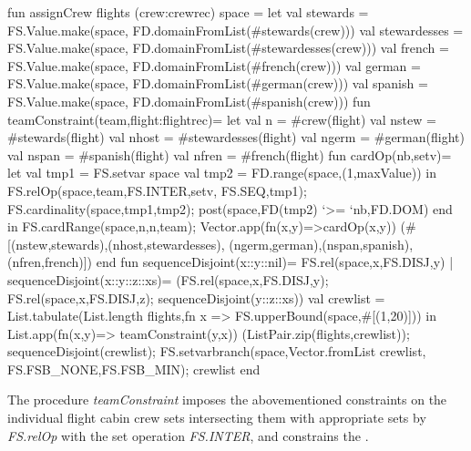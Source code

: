 \documentclass[a4paper]{scrartcl}
\begin{document}
\begin{myverbatim}
fun assignCrew flights (crew:crewrec) space =
    let
       val stewards = FS.Value.make(space,
                      FD.domainFromList(#stewards(crew)))
       val stewardesses = FS.Value.make(space,
                      FD.domainFromList(#stewardesses(crew)))
       val french = FS.Value.make(space,
                      FD.domainFromList(#french(crew)))
       val german = FS.Value.make(space,
                      FD.domainFromList(#german(crew)))
       val spanish = FS.Value.make(space,
                      FD.domainFromList(#spanish(crew)))
       fun teamConstraint(team,flight:flightrec)=
           let
              val n = #crew(flight)
              val nstew = #stewards(flight)
              val nhost = #stewardesses(flight)
              val ngerm = #german(flight)
              val nspan = #spanish(flight)
              val nfren = #french(flight)
              fun cardOp(nb,setv)= 
                  let
                     val tmp1 = FS.setvar space
                     val tmp2 = FD.range(space,(1,maxValue))
                  in
                     FS.relOp(space,team,FS.INTER,setv,
                              FS.SEQ,tmp1);
                     FS.cardinality(space,tmp1,tmp2);
                     post(space,FD(tmp2) `>= `nb,FD.DOM)
                  end
            in
               FS.cardRange(space,n,n,team);
               Vector.app(fn(x,y)=>cardOp(x,y))
               (#[(nstew,stewards),(nhost,stewardesses),
                  (ngerm,german),(nspan,spanish),(nfren,french)])
            end
       fun sequenceDisjoint(x::y::nil)= FS.rel(space,x,FS.DISJ,y)
         | sequenceDisjoint(x::y::z::xs)= 
                          (FS.rel(space,x,FS.DISJ,y);
                           FS.rel(space,x,FS.DISJ,z);
                           sequenceDisjoint(y::z::xs))         
       val crewlist = List.tabulate(List.length flights,fn x =>
                                    FS.upperBound(space,#[(1,20)]))         
    in
       List.app(fn(x,y)=> teamConstraint(y,x))
               (ListPair.zip(flights,crewlist));
       sequenceDisjoint(crewlist);
       FS.setvarbranch(space,Vector.fromList crewlist,
                       FS.FSB_NONE,FS.FSB_MIN); 
       crewlist
    end
\end{myverbatim}


The procedure {\it teamConstraint} imposes the abovementioned constraints 
on the individual flight cabin crew sets intersecting them with 
appropriate sets by {\it FS.relOp} with the set operation {\it FS.INTER},
and constrains the . \\
\end{document}
